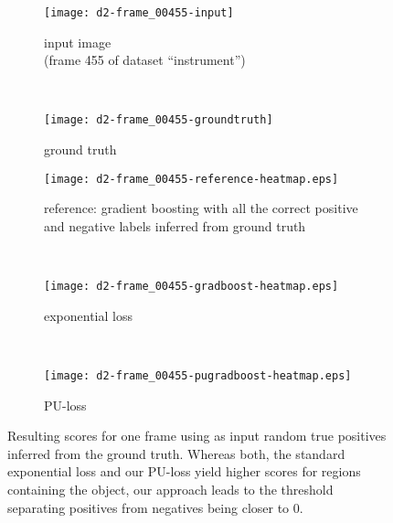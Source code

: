 \begin{figure}[ht]
	\centering
 	\begin{subfigure}[h]{0.48\textwidth}
	  \texttt{[image: d2-frame\_00455-input]}
	  \caption*{input image \\ (frame 455 of dataset ``instrument'')}
	\end{subfigure}
	~
	\begin{subfigure}[h]{0.48\textwidth}
	  \texttt{[image: d2-frame\_00455-groundtruth]}
	  \caption*{ground truth \\ \quad}
	\end{subfigure}
	
	\vspace{3mm}
	\begin{subfigure}[h]{0.48\textwidth}
	  \texttt{[image: d2-frame\_00455-reference-heatmap.eps]}
	  \caption*{reference: gradient boosting with all the correct positive and negative labels inferred from ground truth}	
	\end{subfigure}
	~
	\begin{subfigure}[h]{0.48\textwidth}
	  \texttt{[image: d2-frame\_00455-gradboost-heatmap.eps]}
	  \caption*{exponential loss \newline}
	\end{subfigure}	
	~
	\begin{subfigure}[h]{0.48\textwidth}
	  \texttt{[image: d2-frame\_00455-pugradboost-heatmap.eps]}
		  \caption*{PU-loss \\ }
	\end{subfigure}		
	\caption{Resulting scores for one frame using as input random true positives inferred from the ground truth. Whereas both, the standard exponential loss and our PU-loss yield higher scores for regions containing the object, our approach leads to the threshold separating positives from negatives being closer to 0.}
	\label{fig:bias-in-heatmaps}
\end{figure}

